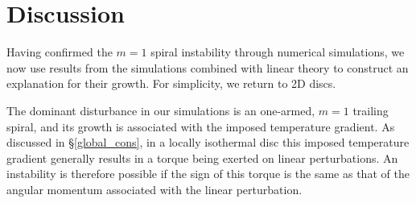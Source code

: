 \section{Discussion}\label{discussions} 
Having confirmed the $m=1$ spiral instability through numerical
simulations, we now use results from the simulations combined with
linear theory to construct an explanation for their growth. For
simplicity, we return to 2D discs. 

The dominant disturbance in our simulations is an one-armed, $m=1$
trailing spiral, and its growth is associated with the imposed temperature
gradient. As discussed in \S\ref{global_cons}, in a locally isothermal disc this imposed
temperature gradient generally results in a torque being exerted on
linear perturbations. An instability is therefore possible if the sign
of this torque is the same as that of the angular momentum associated
with the linear perturbation. 




 


